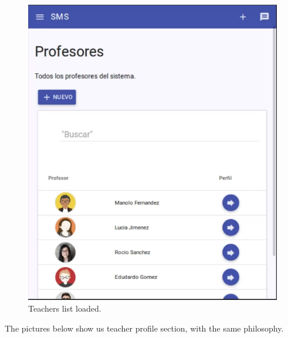 \begin{figure}[H]
\begin{minipage}{.5\textwidth}
  \includegraphics[scale=0.3]{img/snaps/teachers_list.png}
  \caption{Teachers list loaded.}
\end{minipage}
\end{figure}

\pagebreak
\noindent The pictures below show us teacher profile section, with
the same philosophy.


